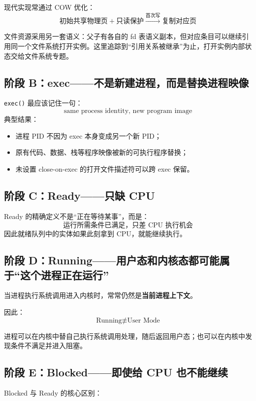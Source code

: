 \documentclass[11pt,a4paper]{ctexart}
\newcommand{\kw}[1]{\textbf{#1}}
\newcommand{\code}[1]{\texttt{#1}}
\begin{document}
现代实现常通过 COW 优化：
\[
\text{初始共享物理页}+\text{只读保护}\xrightarrow{\text{首次写}}\text{复制对应页}
\]

文件资源采用另一套语义：父子有各自的 fd 表语义副本，但对应条目可以继续引用同一个文件系统打开实例。这里追踪到“引用关系被继承”为止，打开实例内部状态交给文件系统专题。

\subsection{阶段 B：exec——不是新建进程，而是替换进程映像}

\code{exec()} 最应该记住一句：
\[
\boxed{\text{same process identity, new program image}}
\]
典型结果：
\begin{itemize}
\item 进程 PID 不因为 exec 本身变成另一个新 PID；
\item 原有代码、数据、栈等程序映像被新的可执行程序替换；
\item 未设置 close-on-exec 的打开文件描述符可以跨 exec 保留。
\end{itemize}

\subsection{阶段 C：Ready——只缺 CPU}

Ready 的精确定义不是“正在等待某事”，而是：
\[
\boxed{\text{运行所需条件已满足，只差 CPU 执行机会}}
\]
因此就绪队列中的实体如果此刻拿到 CPU，就能继续执行。

\subsection{阶段 D：Running——用户态和内核态都可能属于“这个进程正在运行”}

当进程执行系统调用进入内核时，常常仍然是\kw{当前进程上下文}。

因此：
\[
\text{Running}\not\equiv\text{User Mode}
\]

进程可以在内核中替自己执行系统调用处理，随后返回用户态；也可以在内核中发现条件不满足并进入阻塞。

\subsection{阶段 E：Blocked——即使给 CPU 也不能继续}

Blocked 与 Ready 的核心区别：
\end{document}
